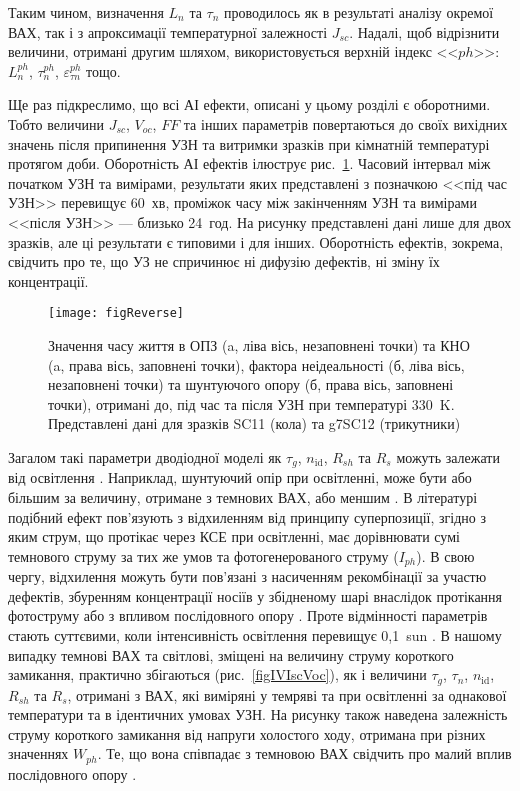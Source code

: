 Таким чином, визначення $L_n$ та $\tau_n$ проводилось як в результаті аналізу окремої ВАХ, так і з апроксимації
температурної залежності $J_{sc}$.
Надалі, щоб відрізнити величини, отримані другим шляхом, використовується верхній індекс <<$ph$>>: $L_n^{ph}$, $\tau_n^{ph}$, $\varepsilon_{\tau n}^{ph}$ тощо.

Ще раз підкреслимо, що всі АІ ефекти, описані у цьому розділі є оборотними.
Тобто величини $J_{sc}$, $V_{oc}$, $F\!F$ та інших параметрів повертаються до своїх вихідних значень
після припинення УЗН  та витримки зразків при кімнатній температурі протягом доби.
Оборотність АІ ефектів ілюструє рис.~\ref{figReverse}.
Часовий інтервал між початком УЗН та вимірами, результати яких представлені з позначкою <<під час УЗН>>
перевищує 60~хв, проміжок часу між закінченням УЗН та вимірами <<після УЗН>> --- близько 24~год.
На рисунку представлені дані лише для двох зразків, але ці результати є типовими і для інших.
Оборотність ефектів, зокрема, свідчить про те, що УЗ не спричинює ні дифузію дефектів,
ні зміну їх концентрації.

\begin{figure}
\center
\texttt{[image: figReverse]}%
\caption{\label{figReverse}
Значення часу життя в ОПЗ (a, ліва вісь, незаповнені точки)
та КНО (a, права вісь, заповнені точки),
фактора неідеальності (б, ліва вісь, незаповнені точки) та
шунтуючого опору (б, права вісь, заповнені точки),
отримані до, під час та після УЗН при температурі 330~K.
Представлені дані для зразків SC11 (кола) та g7SC12 (трикутники)
}%
\end{figure}

Загалом такі параметри дводіодної моделі як $\tau_g$, $n_{\mathrm{id}}$, $R_{sh}$ та $R_s$ можуть залежати від освітлення \cite{Iph:KHAN2010,Breitenstein2013,SUGIANTO2009}.
Наприклад, шунтуючий опір при освітленні, може бути або більшим за величину, отримане з темнових ВАХ\cite{Iph:KHAN2010}, або меншим \cite{Breitenstein2013,SUGIANTO2009}.
В літературі \cite{Breitenstein2013} подібний ефект пов'язують з відхиленням від принципу суперпозиції,
згідно з яким струм, що протікає через КСЕ при освітленні, має дорівнювати сумі темнового струму за тих же умов та фотогенерованого струму ($I_{ph}$).
В свою чергу, відхилення можуть бути пов'язані з насиченням рекомбінації за участю дефектів,
збуренням концентрації носіїв у збідненому шарі внаслідок протікання фотоструму \cite{Robinson} або з впливом послідовного опору \cite{Rs:BREITENSTEIN2013}.
Проте відмінності параметрів стають суттєвими, коли інтенсивність освітлення перевищує 0,1~sun \cite{Breitenstein2013}.
В нашому випадку темнові ВАХ та світлові, зміщені на величину струму короткого замикання, практично збігаються (рис.~\ref{figIVIscVoc}),
як і величини $\tau_g$, $\tau_n$, $n_{\mathrm{id}}$, $R_{sh}$ та $R_s$, отримані з ВАХ, які виміряні у темряві та при освітленні за однакової температури
та в ідентичних умовах УЗН.
На рисунку також наведена залежність струму короткого замикання від напруги холостого ходу, отримана при різних значеннях $W_{ph}$.
Те, що вона співпадає з темновою ВАХ свідчить про малий вплив послідовного опору \cite{Robinson}.

